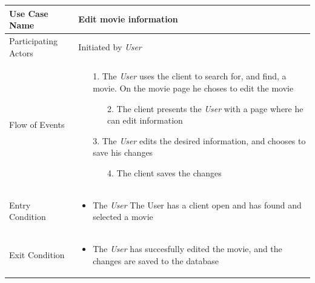 \begin{center}
	\begin{tabular}{ | l | p{10cm} |  }
		 \hline
		Use Case Name & Edit movie information \\ \hline
		Participating Actors & Initiated by \emph{User} \\ \hline
		Flow of Events & \begin{enumerate}
						\item[1.] The \emph{User} uses the client to search for, and find, a movie. On the movie page he choses to edit the movie
						\begin{enumerate}
							\item[2.] The client presents the \emph{User} with a page where he can edit information
						\end{enumerate}
						\item[3.] The \emph{User} edits the desired information, and chooses to save his changes
						\begin{enumerate}
							\item[4.] The client saves the changes
						\end{enumerate}
					\end{enumerate} \\ \hline
		Entry Condition & \begin{itemize}
						\item The \emph{User} The User has a client open and has found and selected a movie
					\end{itemize} \\ \hline
		Exit Condition & \begin{itemize}
						\item The \emph{User} has succesfully edited the movie, and the changes are saved to the database
					\end{itemize} \\
		\hline
	\end{tabular}
\end{center}




